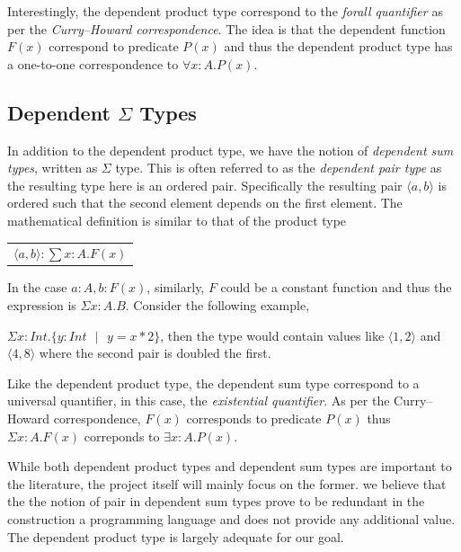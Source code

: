\documentclass[a4paper,12pt]{report}
\begin{document}
\par
Interestingly, the dependent product type correspond to the 
\textit{forall quantifier} as per 
the \textit{Curry–Howard correspondence}. The idea is that the dependent 
function $F(x)$ correspond to predicate $P(x)$ and thus the dependent product 
type has a one-to-one correspondence to $\forall x: A. P(x)$.

\subsection{Dependent $\Sigma$ Types}
In addition to the dependent product type, we have the notion of \textit{dependent sum 
types}, written as $\Sigma$ type. This is often referred to as the 
\textit{dependent pair type} as the resulting type here is an ordered pair. 
Specifically the resulting pair $\langle a,b \rangle$ is ordered such that the 
second element depends on the first element. The 
mathematical definition is similar to that of the product type
\begin{center}
 \begin{tabular}{l}
   $\langle a,b \rangle :\sum x: A.  F(x)$
 \end{tabular} 
\end{center}
In the case $a:A, b: F(x)$, similarly, $F$ could be a constant function and thus 
the expression is $\Sigma x:A.B$. Consider the following example, 

$\Sigma x: Int.\{y:Int\text{ }|\text{ } y = x * 2\}$, then the type would 
contain values like $\langle 1,2 \rangle$ and $\langle 4,8 \rangle$ where the 
second pair is doubled the first.

\par
Like the dependent product type, the dependent sum type correspond to a 
universal quantifier, in this case, the \textit{existential quantifier}. As 
per the Curry–Howard correspondence, $F(x)$ corresponds to predicate $P(x)$ 
thus $\Sigma x:A.F(x)$ correponds to $\exists x: A. P(x)$.

\par
While both dependent product types and dependent sum types are important to the 
literature, the project itself will mainly focus on the former. we believe that 
the the notion of pair in dependent sum types prove to be redundant in 
the construction a programming language and does not provide any additional 
value. The dependent product type is largely adequate for our goal.
\end{document}

